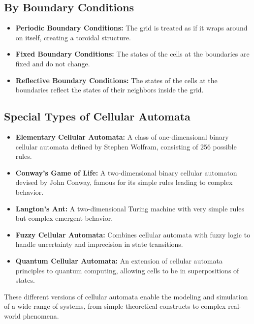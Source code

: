 \documentclass[9pt,a4paper,twoside]{tau-class/tau}
\begin{document}
\subsection{By Boundary Conditions}

\begin{itemize}
    \item \textbf{Periodic Boundary Conditions:} The grid is treated as if it wraps around on itself, creating a toroidal structure.
    \item \textbf{Fixed Boundary Conditions:} The states of the cells at the boundaries are fixed and do not change.
    \item \textbf{Reflective Boundary Conditions:} The states of the cells at the boundaries reflect the states of their neighbors inside the grid.
\end{itemize}

\subsection{Special Types of Cellular Automata}

\begin{itemize}
    \item \textbf{Elementary Cellular Automata:} A class of one-dimensional binary cellular automata defined by Stephen Wolfram, consisting of 256 possible rules.
    \item \textbf{Conway's Game of Life:} A two-dimensional binary cellular automaton devised by John Conway, famous for its simple rules leading to complex behavior.
    \item \textbf{Langton's Ant:} A two-dimensional Turing machine with very simple rules but complex emergent behavior.
    \item \textbf{Fuzzy Cellular Automata:} Combines cellular automata with fuzzy logic to handle uncertainty and imprecision in state transitions.
    \item \textbf{Quantum Cellular Automata:} An extension of cellular automata principles to quantum computing, allowing cells to be in superpositions of states.
\end{itemize}

These different versions of cellular automata enable the modeling and simulation of a wide range of systems, from simple theoretical constructs to complex real-world phenomena.


\end{document}
